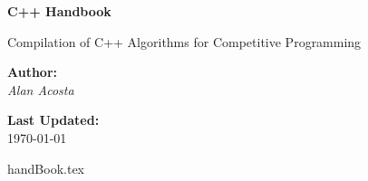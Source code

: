 \documentclass[11pt, titlepage]{article}
\begin{document}
    \begin{titlepage}
        \begin{center}
            \vspace*{1cm}
            \Huge
            \textbf{C++ Handbook}
            
            \vspace{0.5cm}
            \LARGE
            Compilation of C++ Algorithms for Competitive Programming
            
            \vspace{1.5cm}
            \textbf{Author:} \\
            \Large
            \textit{Alan Acosta}
            
            \vfill
            \Large
            \textbf{Last Updated:} \\
            \today
        \end{center}
    \end{titlepage}

    \tableofcontents
    
    \newpage
    
    {handBook.tex}
\end{document}

